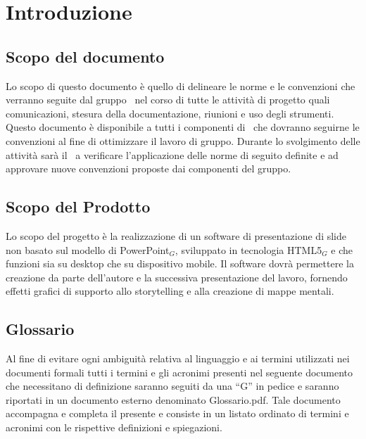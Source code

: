 \section{Introduzione}

\subsection{Scopo del documento}
Lo scopo di questo documento è quello di delineare le norme e le convenzioni che verranno seguite dal gruppo \gruppo\ nel corso di tutte le attività di progetto quali comunicazioni, stesura della documentazione, riunioni e uso degli strumenti.
Questo documento è disponibile a tutti i componenti di \gruppo\ che dovranno seguirne le convenzioni al fine di ottimizzare il lavoro di gruppo.
Durante lo svolgimento delle attività sarà il \ruoloResponsabile\ a verificare l’applicazione delle norme di seguito definite e ad approvare nuove convenzioni proposte dai componenti del gruppo.

\subsection{Scopo del Prodotto}
Lo scopo del progetto è la realizzazione di un software di presentazione di slide non basato sul modello di PowerPoint$_G$, sviluppato in tecnologia HTML5$_G$ e che funzioni sia su desktop che su dispositivo mobile. Il software dovrà permettere la creazione da parte dell'autore e la successiva presentazione del lavoro, fornendo effetti grafici di supporto allo storytelling e alla creazione di mappe mentali. 

\subsection{Glossario}
Al fine di evitare ogni ambiguità relativa al linguaggio e ai termini utilizzati nei documenti formali tutti i termini e gli acronimi presenti nel seguente documento che necessitano di definizione saranno seguiti da una ``G'' in pedice e saranno riportati in un documento esterno denominato Glossario.pdf. Tale documento accompagna e completa il presente e consiste in un listato ordinato di termini e acronimi con le rispettive definizioni e spiegazioni.
